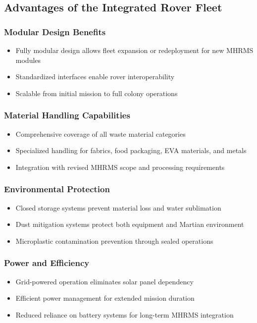 \documentclass[12pt, a4paper]{article}
\begin{document}
\subsection{Advantages of the Integrated Rover Fleet}

\subsubsection{Modular Design Benefits}
\begin{itemize}
    \item Fully modular design allows fleet expansion or redeployment for new MHRMS modules
    \item Standardized interfaces enable rover interoperability
    \item Scalable from initial mission to full colony operations
\end{itemize}

\subsubsection{Material Handling Capabilities}
\begin{itemize}
    \item Comprehensive coverage of all waste material categories
    \item Specialized handling for fabrics, food packaging, EVA materials, and metals
    \item Integration with revised MHRMS scope and processing requirements
\end{itemize}

\subsubsection{Environmental Protection}
\begin{itemize}
    \item Closed storage systems prevent material loss and water sublimation
    \item Dust mitigation systems protect both equipment and Martian environment
    \item Microplastic contamination prevention through sealed operations
\end{itemize}

\subsubsection{Power and Efficiency}
\begin{itemize}
    \item Grid-powered operation eliminates solar panel dependency
    \item Efficient power management for extended mission duration
    \item Reduced reliance on battery systems for long-term MHRMS integration
\end{itemize}
\end{document}
